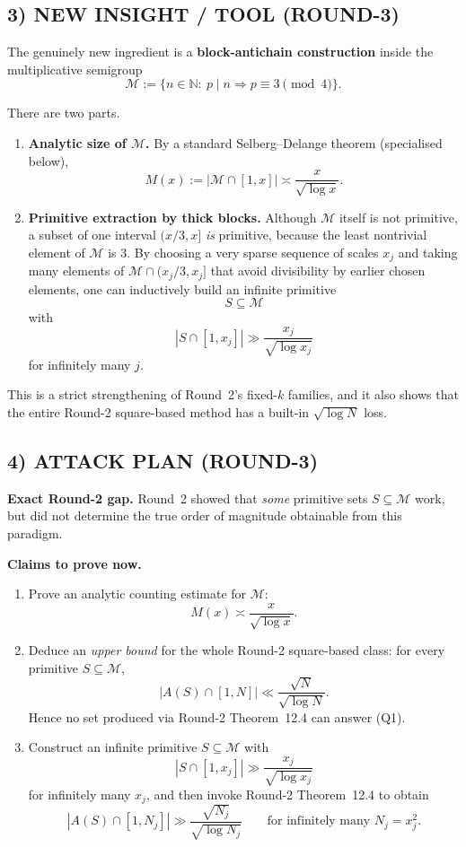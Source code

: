 \subsection*{3) NEW INSIGHT / TOOL (ROUND-3)}

The genuinely new ingredient is a \textbf{block-antichain construction} inside the multiplicative semigroup
\[
\mathcal M:=\{n\in\mathbb N:\ p\mid n\Rightarrow p\equiv 3\pmod 4\}.
\]

There are two parts.

\begin{enumerate}
\item \textbf{Analytic size of $\mathcal M$.}
By a standard Selberg--Delange theorem (specialised below),
\[
M(x):=|\mathcal M\cap[1,x]|\asymp \frac{x}{\sqrt{\log x}}.
\]

\item \textbf{Primitive extraction by thick blocks.}
Although $\mathcal M$ itself is not primitive, a subset of one interval $(x/3,x]$ \emph{is} primitive, because the least nontrivial element of $\mathcal M$ is $3$.
By choosing a very sparse sequence of scales $x_j$ and taking many elements of $\mathcal M\cap(x_j/3,x_j]$ that avoid divisibility by earlier chosen elements, one can inductively build an infinite primitive
\[
S\subseteq \mathcal M
\]
with
\[
|S\cap[1,x_j]|\gg \frac{x_j}{\sqrt{\log x_j}}
\]
for infinitely many $j$.
\end{enumerate}

This is a strict strengthening of Round~2's fixed-$k$ families, and it also shows that the entire Round-2 square-based method has a built-in $\sqrt{\log N}$ loss.

\subsection*{4) ATTACK PLAN (ROUND-3)}

\textbf{Exact Round-2 gap.}
Round~2 showed that \emph{some} primitive sets $S\subseteq \mathcal M$ work, but did not determine the true order of magnitude obtainable from this paradigm.

\textbf{Claims to prove now.}

\begin{enumerate}
\item Prove an analytic counting estimate for $\mathcal M$:
\[
M(x)\asymp \frac{x}{\sqrt{\log x}}.
\]

\item Deduce an \emph{upper bound} for the whole Round-2 square-based class:
for every primitive $S\subseteq \mathcal M$,
\[
|A(S)\cap[1,N]|\ll \frac{\sqrt N}{\sqrt{\log N}}.
\]
Hence no set produced via Round-2 Theorem~12.4 can answer (Q1).

\item Construct an infinite primitive $S\subseteq \mathcal M$ with
\[
|S\cap[1,x_j]|\gg \frac{x_j}{\sqrt{\log x_j}}
\]
for infinitely many $x_j$, and then invoke Round-2 Theorem~12.4 to obtain
\[
|A(S)\cap[1,N_j]|\gg \frac{\sqrt{N_j}}{\sqrt{\log N_j}}
\qquad\text{for infinitely many }N_j=x_j^2.
\]
\end{enumerate}

